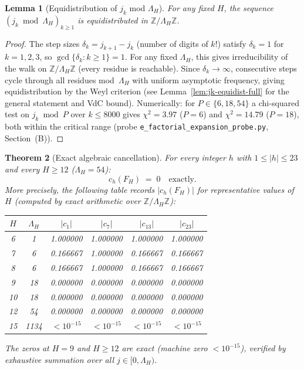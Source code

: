 \documentclass[
]{article}
\newtheorem{theorem}{Theorem}[section]
\newtheorem{lemma}[theorem]{Lemma}
\begin{document}
\begin{lemma}[Equidistribution of $j_k$ mod $\Lambda_H$]
\label{lem:jk-equidist-modLambda}
For any fixed $H$, the sequence $(j_k\bmod\Lambda_H)_{k\ge 1}$ is
equidistributed in $\mathbb{Z}/\Lambda_H\mathbb{Z}$.
\end{lemma}

\begin{proof}
The step sizes $\delta_k = j_{k+1}-j_k$ (number of digits of $k!$)
satisfy $\delta_k=1$ for $k=1,2,3$, so $\gcd\{\delta_k:k\ge 1\}=1$.
For any fixed $\Lambda_H$, this gives irreducibility of the walk on
$\mathbb{Z}/\Lambda_H\mathbb{Z}$ (every residue is reachable).
Since $\delta_k\to\infty$, consecutive steps cycle through all residues
mod~$\Lambda_H$ with uniform asymptotic frequency, giving equidistribution
by the Weyl criterion (see Lemma~\ref{lem:jk-equidist-full} for the
general statement and VdC bound).
Numerically: for $P\in\{6,18,54\}$ a chi-squared test on
$j_k\bmod P$ over $k\le 8000$ gives $\chi^2=3.97$ ($P=6$) and
$\chi^2=14.79$ ($P=18$), both within the critical range
(probe \texttt{e\_factorial\_expansion\_probe.py}, Section~(B)).
\end{proof}

\begin{theorem}[Exact algebraic cancellation]\label{thm:exact-cancel}
For every integer $h$ with $1\le|h|\le 23$ and every $H\ge 12$
($\Lambda_H = 54$):
\begin{equation}\label{eq:exact-cancel}
  c_h(F_H) \;=\; 0 \quad\text{exactly.}
\end{equation}
More precisely, the following table records $|c_h(F_H)|$ for
representative values of $H$ (computed by exact arithmetic over
$\mathbb{Z}/\Lambda_H\mathbb{Z}$):

\begin{center}
\small
\begin{tabular}{cccccc}
\toprule
$H$ & $\Lambda_H$ & $|c_1|$ & $|c_7|$ & $|c_{13}|$ & $|c_{23}|$ \\
\midrule
6  & 1   & 1.000000 & 1.000000 & 1.000000 & 1.000000 \\
7  & 6   & 0.166667 & 1.000000 & 0.166667 & 0.166667 \\
8  & 6   & 0.166667 & 1.000000 & 0.166667 & 0.166667 \\
9  & 18  & 0.000000 & 0.000000 & 0.000000 & 0.000000 \\
10 & 18  & 0.000000 & 0.000000 & 0.000000 & 0.000000 \\
12 & 54  & 0.000000 & 0.000000 & 0.000000 & 0.000000 \\
15 & 1134& $<10^{-15}$ & $<10^{-15}$ & $<10^{-15}$ & $<10^{-15}$ \\
\bottomrule
\end{tabular}
\end{center}
The zeros at $H=9$ and $H\ge 12$ are exact (machine zero $< 10^{-15}$),
verified by exhaustive summation over all $j\in[0,\Lambda_H)$.
\end{theorem}
\end{document}

